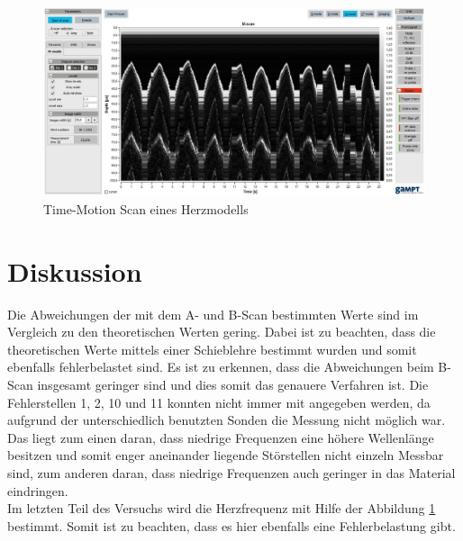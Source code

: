 \begin{figure}
  \includegraphics[width=\textwidth]{herz.jpg}
  \caption{Time-Motion Scan eines Herzmodells}
  \label{fig:herz}
\end{figure}

\section{Diskussion}

Die Abweichungen der mit dem A- und B-Scan bestimmten Werte sind im Vergleich zu den theoretischen Werten gering.
Dabei ist zu beachten, dass die theoretischen Werte mittels einer Schieblehre bestimmt wurden und somit ebenfalls fehlerbelastet sind.
Es ist zu erkennen, dass die Abweichungen beim B-Scan insgesamt geringer sind
und dies somit das genauere Verfahren ist.
Die Fehlerstellen 1, 2, 10  und 11 konnten nicht immer mit angegeben werden,
da aufgrund der unterschiedlich benutzten Sonden die Messung nicht möglich war.
Das liegt zum einen daran, dass niedrige Frequenzen eine höhere Wellenlänge besitzen
und somit enger aneinander liegende Störstellen nicht einzeln Messbar sind,
zum anderen daran, dass niedrige Frequenzen auch geringer in das Material eindringen.\\
Im letzten Teil des Versuchs wird die Herzfrequenz mit Hilfe der Abbildung \ref{fig:herz} bestimmt.
Somit ist zu beachten, dass es hier ebenfalls eine Fehlerbelastung gibt.
